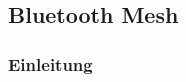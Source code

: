 \vspace*{4cm}
\begin{center}
\part{Bluetooth Mesh}
\end{center}
\vspace*{\fill}
\clearpage

\section{Einleitung}\label{sec:EinleitungBluetooth}








